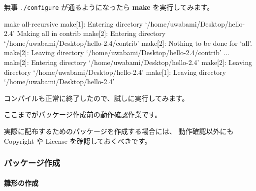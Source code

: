 \documentclass[mingoth,a4paper]{jsarticle}
\begin{document}
無事 {\tt ./configure} が通るようになったら {\bf make} を実行してみます。
\begin{commandline}
make all-recursive
make[1]: Entering directory `/home/uwabami/Desktop/hello-2.4'
Making all in contrib
make[2]: Entering directory `/home/uwabami/Desktop/hello-2.4/contrib'
make[2]: Nothing to be done for `all'.
make[2]: Leaving directory `/home/uwabami/Desktop/hello-2.4/contrib'
...
make[2]: Entering directory `/home/uwabami/Desktop/hello-2.4'
make[2]: Leaving directory `/home/uwabami/Desktop/hello-2.4'
make[1]: Leaving directory `/home/uwabami/Desktop/hello-2.4'
\end{commandline}
コンパイルも正常に終了したので、試しに実行してみます。
\begin{commandline}
\end{commandline}
ここまでがパッケージ作成前の動作確認作業です。

実際に配布するためのパッケージを作成する場合には、 
動作確認以外にも Copyright や License を確認しておくべきです。

\subsubsection{パッケージ作成}

\paragraph{雛形の作成}
\end{document}
